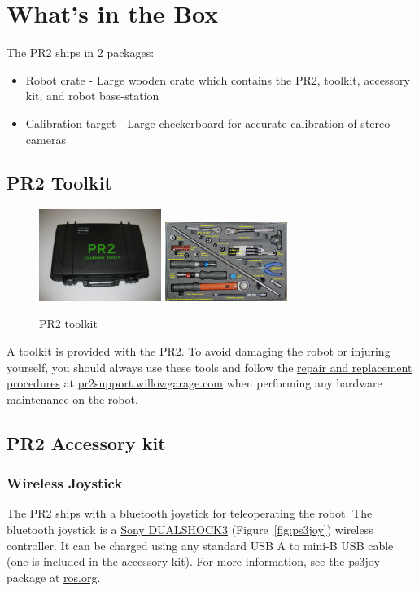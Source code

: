 \chapter{What's in the Box}
The PR2 ships in 2 packages:
\begin{itemize}
  \item Robot crate - Large wooden crate which contains the PR2, toolkit, accessory kit, and robot base-station 
  \item Calibration target - Large checkerboard for accurate calibration of stereo cameras 
\end{itemize}

\section{PR2 Toolkit}
\begin{figure}[h!]
\centering
\includegraphics[width=150px]{images/toolkit.png}
\includegraphics[width=150px]{images/toolkit_layout.png}
\caption{PR2 toolkit}
\label{fig:toolkit}
\end{figure}
\label{toolkit}
A toolkit is provided with the PR2.  To avoid damaging the robot or injuring yourself, you should always use these tools and follow the \href{http://pr2support.willowgarage.com/wiki/PR2%20Service%20Information}{repair and replacement procedures} at \href{pr2support.willowgarage.com}{pr2support.willowgarage.com} when performing any hardware maintenance on the robot.

\section{PR2 Accessory kit}
\subsection{Wireless Joystick}
The PR2 ships with a bluetooth joystick for teleoperating the robot. The
bluetooth joystick is a
\href{http://www.sonystyle.com/webapp/wcs/stores/servlet/ProductDisplay?catalogId=10551&storeId=10151&langId=-1&productId=8198552921665411965#additionalImage1%22}{Sony
  DUALSHOCK3} (Figure~\ref{fig:ps3joy}) wireless controller. It can be charged
using any standard USB A to mini-B USB cable (one is included in the accessory kit). For more information, see the
\href{http://www.ros.org/wiki/ps3joy}{ps3joy} package at
\href{http://www.ros.org}{ros.org}.

